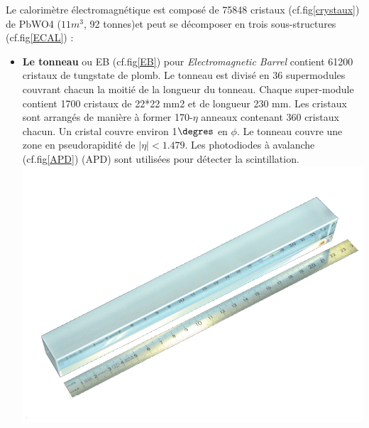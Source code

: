 Le calorimètre électromagnétique est composé de 75848 cristaux (cf.fig\ref{crystaux}) de PbWO4 ($11 m^3$, 92 tonnes)et peut se décomposer en trois sous-structures (cf.fig\ref{ECAL}) :
\begin{itemize}[label=$\bullet$]
	\item \textbf{Le tonneau} ou EB (cf.fig\ref{EB}) pour \textit{Electromagnetic Barrel} contient 61200 cristaux de tungstate de plomb. Le tonneau est divisé en 36 supermodules couvrant chacun la moitié de la longueur du tonneau. Chaque super-module contient 1700 cristaux de 22*22 mm2 et de longueur 230 mm. Les cristaux sont arrangés de manière à former 170-$\eta$ anneaux contenant 360 cristaux chacun. Un cristal couvre environ 1$\degres$ en $\phi$. Le tonneau couvre une zone en pseudorapidité de $|\eta|<1.479$. Les photodiodes à avalanche (cf.fig\ref{APD}) (APD) sont utilisées pour détecter la scintillation.
	\marginpar
	{
		\centering
		\includegraphics[width=\marginparwidth]{CMS/Crystaux.png}
		\label{crystaux}
	}
	

\end{itemize}
